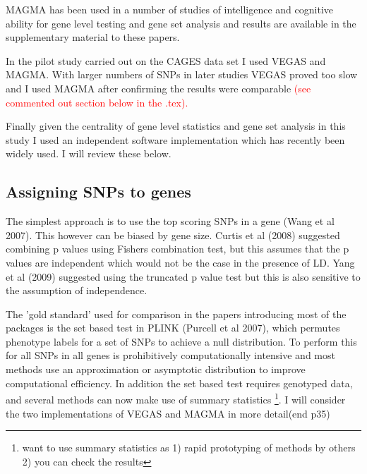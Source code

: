 MAGMA has been used in a number of studies of intelligence and cognitive ability for gene level testing and gene set analysis and results are available in the supplementary material to these papers.

In the pilot study carried out on the CAGES data set I used VEGAS and MAGMA. With larger numbers of SNPs in later studies VEGAS proved too slow and I used MAGMA after confirming the results were comparable \textcolor{red}{(see commented out section below in the .tex).} 


Finally given the centrality of gene level statistics and gene set analysis in this study I used an independent software implementation which has recently been widely used. I will review these below. 






\subsection{Assigning SNPs to genes}

The simplest approach is to use the top scoring SNPs in a gene (Wang et al 2007). This however can be biased by gene size. Curtis et al (2008) suggested combining p values using Fishers combination test, but this assumes that the p values are independent which would not be the case in the presence of LD. Yang et al (2009)
suggested using the truncated p value test but this is also sensitive to the assumption of independence. 

The 'gold standard' used for comparison in the papers introducing most of the packages is the set based test in PLINK (Purcell et al 2007), which permutes phenotype labels for a set of SNPs to achieve a null distribution. To perform this for all SNPs in all genes is prohibitively computationally intensive and most methods use an approximation or asymptotic distribution to improve computational efficiency. In addition the set based test requires genotyped data, and several methods can now make use of summary statistics \footnote{want to use summary statistics as 1) rapid prototyping of methods by others 2) you can check the results}. I will consider the two implementations of VEGAS and MAGMA in more detail(end p35)

